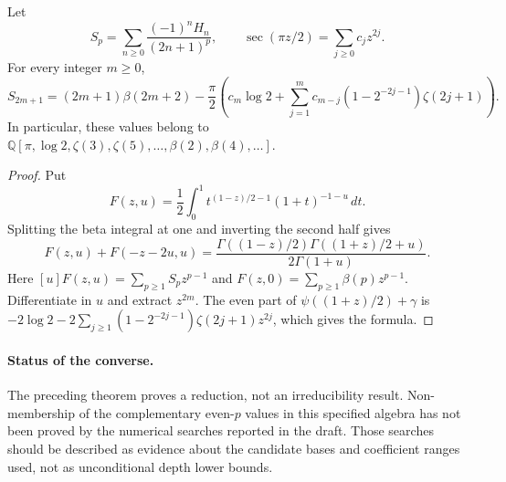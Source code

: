 \begin{theorem}
Let
\[
 S_p=\sum_{n\ge0}\frac{(-1)^nH_n}{(2n+1)^p},\qquad
 \sec(\pi z/2)=\sum_{j\ge0}c_jz^{2j}.
\]
For every integer $m\ge0$,
\[
 S_{2m+1}=(2m+1)\beta(2m+2)
 -\frac\pi2\left(c_m\log2+
 \sum_{j=1}^m c_{m-j}(1-2^{-2j-1})\zeta(2j+1)\right).
\]
In particular, these values belong to
$\mathbb Q[\pi,\log2,\zeta(3),\zeta(5),\ldots,\beta(2),\beta(4),\ldots]$.
\end{theorem}
\begin{proof}
Put
\[
 F(z,u)=\frac12\int_0^1
 t^{(1-z)/2-1}(1+t)^{-1-u}\,dt.
\]
Splitting the beta integral at one and inverting the second half gives
\[
 F(z,u)+F(-z-2u,u)
 =\frac{\Gamma((1-z)/2)\Gamma((1+z)/2+u)}{2\Gamma(1+u)}.
\]
Here $[u]F(z,u)=\sum_{p\ge1}S_pz^{p-1}$ and
$F(z,0)=\sum_{p\ge1}\beta(p)z^{p-1}$. Differentiate in $u$ and extract
$z^{2m}$. The even part of $\psi((1+z)/2)+\gamma$ is
$-2\log2-2\sum_{j\ge1}(1-2^{-2j-1})\zeta(2j+1)z^{2j}$,
which gives the formula.
\end{proof}
\paragraph{Status of the converse.}
The preceding theorem proves a reduction, not an irreducibility result.
Non-membership of the complementary even-$p$ values in this specified algebra
has not been proved by the numerical searches reported in the draft. Those
searches should be described as evidence about the candidate bases and
coefficient ranges used, not as unconditional depth lower bounds.
